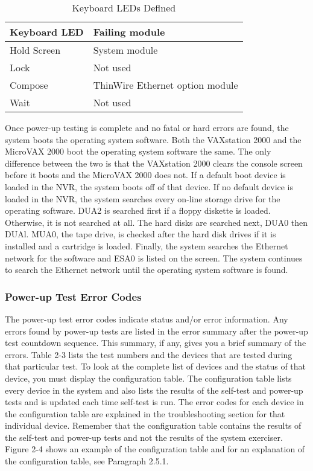 \documentclass{decsectional}
\begin{document}
\begin{table}
\label{table:2}
\caption{Keyboard LEDs Deflned}
\begin{tabularx}{\textwidth}{l l}
\hline
\textbf{Keyboard LED} & \textbf{Failing module}\\
\hline
Hold Screen & System module \\
Lock & Not used \\
Compose & ThinWire Ethernet option module \\
Wait & Not used \\
\hline
\end{tabularx}
\end{table}

Once power-up testing is complete and no fatal or hard errors are found, the
system boots the operating system software. Both the VAXstation 2000 and
the MicroVAX 2000 boot the operating system software the same. The only
difference between the two is that the VAXstation 2000 clears the console
screen before it boots and the MicroVAX 2000 does not. If a default boot
device is loaded in the NVR, the system boots off of that device. If no
default device is loaded in the NVR, the system searches every on-line
storage drive for the operating software. DUA2 is searched first if a floppy
diskette is loaded. Otherwise, it is not searched at all. The hard disks are
searched next, DUA0 then DUAl. MUA0, the tape drive, is checked after
the hard disk drives if it is installed and a cartridge is loaded. Finally, the
system searches the Ethernet network for the software and ESA0 is listed
on the screen. The system continues to search the Ethernet network until
the operating system software is found.
\newpage
\subsubsection{Power-up Test Error Codes}

The power-up test error codes indicate status and/or error information. Any
errors found by power-up tests are listed in the error summary after the
power-up test countdown sequence. This summary, if any, gives you a brief
summary of the errors. Table 2-3 lists the test numbers and the devices that
are tested during that particular test. To look at the complete list of devices
and the status of that device, you must display the configuration table. The
configuration table lists every device in the system and also lists the results
of the self-test and power-up tests and is updated each time self-test is run.
The error codes for each device in the configuration table are explained in
the troubleshooting section for that individual device. Remember that the
configuration table contains the results of the self-test and power-up tests
and not the results of the system exerciser. Figure 2-4 shows an example
of the configuration table and for an explanation of the configuration table,
see Paragraph 2.5.1.
\end{document}
